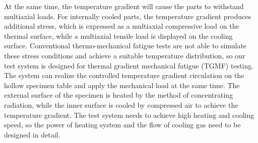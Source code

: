 At the same time, the temperature gradient will cause the parts to withstand multiaxial loads.
For internally cooled parts, the temperature gradient produces additional stress, which is expressed as a multiaxial compressive load on the thermal surface, while a multiaxial tensile load is displayed on the cooling surface.
Conventional thermo-mechanical fatigue tests are not able to simulate these stress conditions and achieve a suitable temperature distribution, so our test system is designed for thermal gradient mechanical fatigue (TGMF) testing.
The system can realize the controlled temperature gradient circulation on the hollow specimen table and apply the mechanical load at the same time.
The external surface of the specimen is heated by the method of concentrating radiation, while the inner surface is cooled by compressed air to achieve the temperature gradient.
The test system needs to achieve high heating and cooling speed, so the power of heating system and the flow of cooling gas need to be designed in detail.


%

